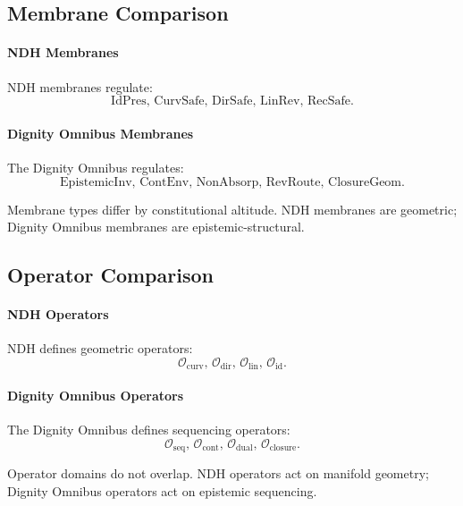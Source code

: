 
\subsection{Membrane Comparison}

\paragraph{NDH Membranes}
NDH membranes regulate:
\[
\mathrm{IdPres},\,
\mathrm{CurvSafe},\,
\mathrm{DirSafe},\,
\mathrm{LinRev},\,
\mathrm{RecSafe}.
\]

\paragraph{Dignity Omnibus Membranes}
The Dignity Omnibus regulates:
\[
\mathrm{EpistemicInv},\,
\mathrm{ContEnv},\,
\mathrm{NonAbsorp},\,
\mathrm{RevRoute},\,
\mathrm{ClosureGeom}.
\]

Membrane types differ by constitutional altitude. NDH membranes are geometric;
Dignity Omnibus membranes are epistemic-structural.


\subsection{Operator Comparison}

\paragraph{NDH Operators}
NDH defines geometric operators:
\[
\mathcal{O}_{\mathrm{curv}},\,
\mathcal{O}_{\mathrm{dir}},\,
\mathcal{O}_{\mathrm{lin}},\,
\mathcal{O}_{\mathrm{id}}.
\]

\paragraph{Dignity Omnibus Operators}
The Dignity Omnibus defines sequencing operators:
\[
\mathcal{O}_{\mathrm{seq}},\,
\mathcal{O}_{\mathrm{cont}},\,
\mathcal{O}_{\mathrm{dual}},\,
\mathcal{O}_{\mathrm{closure}}.
\]

Operator domains do not overlap. NDH operators act on manifold geometry;
Dignity Omnibus operators act on epistemic sequencing.

